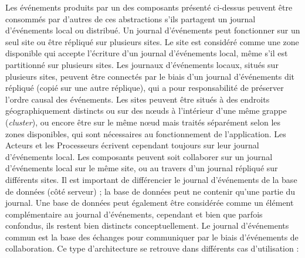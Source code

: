 Les événements produits par un des composants présenté ci-dessus
peuvent être consommés par d'autres de ces abstractions s'ils partagent un 
journal d'événements local ou distribué. Un journal d'événements peut 
fonctionner sur un seul site ou être répliqué 
sur plusieurs sites. 
Le site est considéré comme une zone disponible qui accepte 
l'écriture d'un journal d'événements local, même s'il est partitionné sur plusieurs 
sites. Les journaux d'événements locaux, situés sur plusieurs sites, peuvent être 
connectés par le biais d'un journal d'événements dit \og répliqué\fg{} (copié sur une 
autre réplique), qui a pour responsabilité de préserver l'ordre causal des 
événements.
Les sites peuvent être situés à des endroits géographiquement distincts ou sur 
des nœuds à l'intérieur d'une même grappe (\textit{cluster}), ou encore être sur le 
même nœud mais traités séparément selon les zones 
disponibles, qui sont nécessaires au fonctionnement de l'application. 
Les Acteurs et les Processeurs écrivent cependant toujours sur leur journal 
d'événements local. 
Les composants peuvent soit collaborer sur un journal d'événements local sur le 
même site, ou au travers d'un journal répliqué sur différents sites.
Il est important de différencier le journal d'événements de la base de données 
(côté serveur) ; la base de données peut ne contenir qu'une partie du journal. 
Une base de données peut également être considérée comme un élément 
complémentaire au journal d'événements, cependant et bien que parfois 
confondus, ils restent bien distincts conceptuellement.
Le journal d'événements commun est la base des échanges pour communiquer 
par le biais d'événements de collaboration. Ce type d'architecture se retrouve dans 
différents cas d'utilisation :
